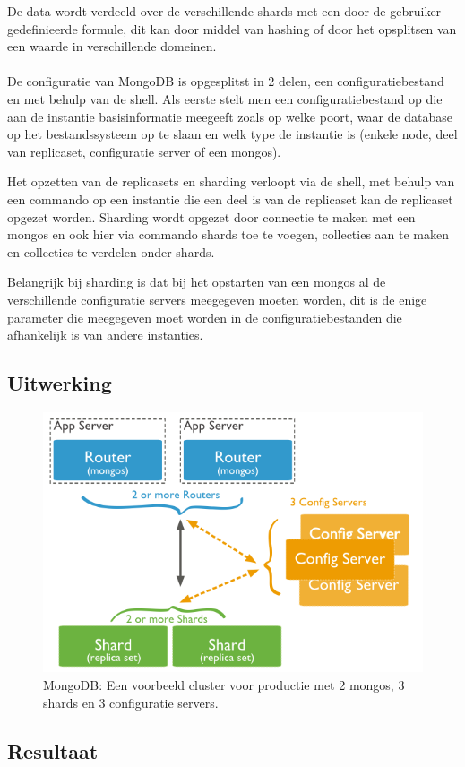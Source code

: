 De data wordt verdeeld over de verschillende shards met een door de gebruiker gedefinieerde formule, dit kan door middel van hashing of door het opsplitsen van een waarde in verschillende domeinen. 

\paragraph{} De configuratie van MongoDB is opgesplitst in 2 delen, een configuratiebestand en met behulp van de shell. Als eerste stelt men een configuratiebestand op die aan de instantie basisinformatie meegeeft zoals op welke poort, waar de database op het bestandssysteem op te slaan en welk type de instantie is (enkele node, deel van replicaset, configuratie server of een mongos). 

Het opzetten van de replicasets en sharding verloopt via de shell, met behulp van een commando op een instantie die een deel is van de replicaset kan de replicaset opgezet worden. 
Sharding wordt opgezet door connectie te maken met een mongos en ook hier via commando shards toe te voegen, collecties aan te maken en collecties te verdelen onder shards.

Belangrijk bij sharding is dat bij het opstarten van een mongos al de verschillende configuratie servers meegegeven moeten worden, dit is de enige parameter die meegegeven moet worden in de configuratiebestanden die afhankelijk is van andere instanties. 

\subsection{Uitwerking}


\begin{figure}[!htb]
	    \centering
    \includegraphics[width=\textwidth]{img/mongo-sharded-cluster-production-architecture.png}
    \caption{MongoDB: Een voorbeeld cluster voor productie met 2 mongos, 3 shards en 3 configuratie servers. \cite{mongodb-shard}}
    \label{fig:mongodb-shards}
\end{figure}
\subsection{Resultaat}